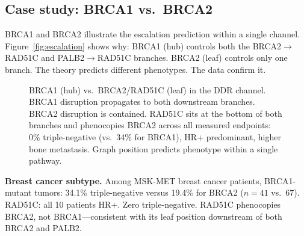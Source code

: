 \documentclass[11pt]{article}
\begin{document}
\subsection{Case study: BRCA1 vs.\ BRCA2}
\label{sec:brca}

BRCA1 and BRCA2 illustrate the escalation prediction within a
single channel. Figure~\ref{fig:escalation} shows why: BRCA1
(hub) controls both the BRCA2$\to$RAD51C and PALB2$\to$RAD51C
branches. BRCA2 (leaf) controls only one branch. The theory
predicts different phenotypes. The data confirm it.

\begin{figure}[ht]
\centering
{}
\caption{BRCA1 (hub) vs.\ BRCA2/RAD51C (leaf) in the DDR channel.
BRCA1 disruption propagates to both downstream branches.
BRCA2 disruption is contained. RAD51C sits at the bottom of
both branches and phenocopies BRCA2 across all measured
endpoints: 0\% triple-negative (vs.\ 34\% for BRCA1),
HR+ predominant, higher bone metastasis. Graph position
predicts phenotype within a single pathway.}
\label{fig:brca}
\end{figure}

\textbf{Breast cancer subtype.}
Among MSK-MET breast cancer patients, BRCA1-mutant tumors: 34.1\%
triple-negative versus 19.4\% for BRCA2 ($n = 41$ vs.\ $67$).
RAD51C: all 10 patients HR+. Zero triple-negative. RAD51C
phenocopies BRCA2, not BRCA1---consistent with its leaf position
downstream of both BRCA2 and PALB2.
\end{document}
